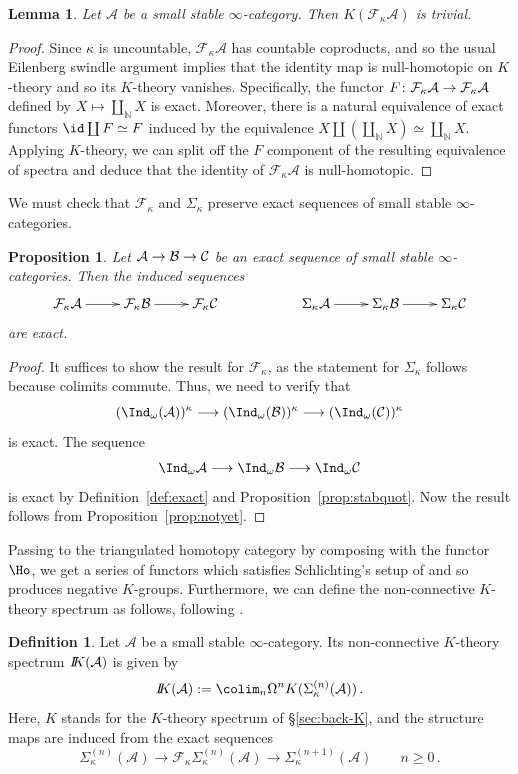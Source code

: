 \documentclass{amsart}
\newcommand{\htp}{\simeq}
\renewcommand{\to}{\mathchoice{\longrightarrow}{\rightarrow}{\rightarrow}{\rightarrow}}
\newcommand{\cA}{{\mathcal A}}
\newcommand{\cF}{{\mathcal F}}
\let\catsymbfont\mathcal
\newcommand{\aA}{{\catsymbfont{A}}}
\newcommand{\aB}{{\catsymbfont{B}}}
\newcommand{\aC}{{\catsymbfont{C}}}
\newcommand{\bbK}{I\mspace{-6.mu}K}
\newcommand{\bN}{{\mathbb{N}}}
\newcommand{\too}{\longrightarrow}%
\renewcommand{\i}{\infty}
\newcommand{\kcone}{\cF_{\kappa}}
\newcommand{\ksusp}{\Sigma_{\kappa}}
\numberwithin{equation}{section}
\newtheorem{lemma}[equation]{Lemma}
\newtheorem{proposition}[equation]{Proposition}
\theoremstyle{definition}
\newtheorem{definition}[equation]{Definition}
\begin{document}
\begin{lemma}
Let $\cA$ be a small stable $\i$-category.  Then $K(\kcone \cA)$
is trivial.
\end{lemma}

\begin{proof}
Since $\kappa$ is uncountable, $\kcone \cA$ has countable coproducts,
and so the usual Eilenberg swindle argument implies that the identity
map is null-homotopic on $K$-theory and so its $K$-theory vanishes.
Specifically, the functor $F \colon \kcone \cA \to \kcone \cA$ defined
by $X \mapsto \coprod_{\bN} X$ is exact.  Moreover, there is a natural
equivalence of exact functors $\id \coprod F \htp F$ induced by the
equivalence $X \coprod (\coprod_{\bN} X) \htp \coprod_{\bN} X$.  Applying
$K$-theory, we can split off the $F$ component of the resulting equivalence of spectra and deduce that the identity of $\kcone \cA$
is null-homotopic.
\end{proof}

We must check that $\kcone$ and $\ksusp$
preserve exact sequences of small stable $\i$-categories.  

\begin{proposition}
Let $\aA \to \aB \to \aC$ be an exact sequence of small stable
$\i$-categories.  Then the induced sequences
\[
\xymatrix{
\kcone \aA \ar[r] & \kcone \aB \ar[r] & \kcone \aC
&& \ksusp \aA \ar[r] & \ksusp \aB \ar[r]
& \ksusp \aC \\
}
\]
are exact.
\end{proposition}

\begin{proof}
It suffices to show the result for $\kcone$, as the statement
for $\ksusp$ follows because colimits commute.
Thus, we need to verify that
\[
(\Ind_\omega (\aA))^{\kappa} \to (\Ind_\omega (\aB))^{\kappa} \to (\Ind_\omega (\aC))^{\kappa}
\]
is exact.  The sequence
\[
\Ind_\omega \aA \to \Ind_\omega \aB \to \Ind_\omega \aC
\]
is exact by Definition~\ref{def:exact} and
Proposition~\ref{prop:stabquot}.  Now the result follows from
Proposition~\ref{prop:notyet}.
\end{proof}

Passing to the triangulated homotopy category by composing with the
functor $\Ho$, we get a series of functors which satisfies
Schlichting's setup of \cite[\S2.2]{Marco} and so produces negative
$K$-groups.  Furthermore, we can define the non-connective $K$-theory spectrum as
follows, following \cite[\S12]{Marco}.

\begin{definition}\label{def:knonconnspec}
Let $\cA$ be a small stable $\i$-category. Its non-connective
$K$-theory spectrum $\bbK(\cA)$ is given by
$$\bbK(\cA) := \colim_n \Omega^n K(\ksusp^{(n)}(\cA)) \,.$$
Here, $K$ stands for the $K$-theory spectrum of \S\ref{sec:back-K}, and
the structure maps are induced from the exact sequences
$$ \ksusp^{(n)}(\cA) \too \kcone \ksusp^{(n)}(\cA) \too \ksusp^{(n+1)}(\cA) \qquad
n \geq 0\,.$$
\end{definition}
\end{document}

